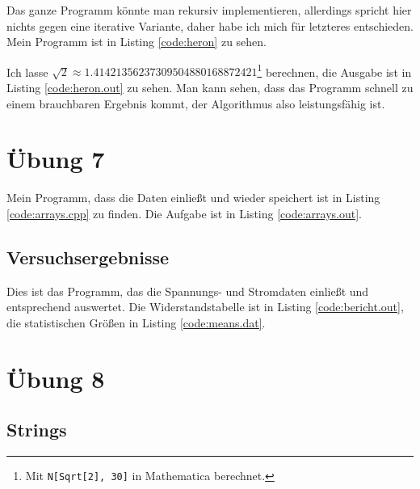 Das ganze Programm könnte man rekursiv implementieren, allerdings spricht hier nichts gegen eine iterative Variante, daher habe ich mich für letzteres entschieden. Mein Programm ist in Listing \ref{code:heron} zu sehen.


Ich lasse $\sqrt{2} \approx 1.41421356237309504880168872421$\footnote{Mit \texttt{N[Sqrt[2], 30]} in Mathematica berechnet.} berechnen, die Ausgabe ist in Listing \ref{code:heron.out} zu sehen. Man kann sehen, dass das Programm schnell zu einem brauchbaren Ergebnis kommt, der Algorithmus also leistungsfähig ist.


\chapter{Übung 7}

Mein Programm, dass die Daten einließt und wieder speichert ist in Listing \ref{code:arrays.cpp} zu finden. Die Aufgabe ist in Listing \ref{code:arrays.out}.


\section{Versuchsergebnisse}

Dies ist das Programm, das die Spannungs- und Stromdaten einließt und entsprechend auswertet. Die Widerstandstabelle ist in Listing \ref{code:bericht.out}, die statistischen Größen in Listing \ref{code:means.dat}.


\chapter{Übung 8}

\section{Strings}


